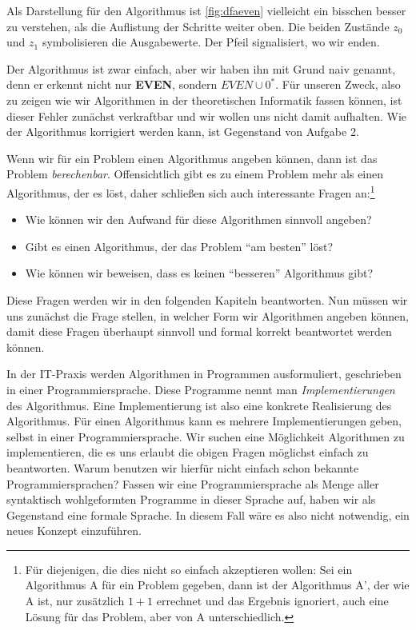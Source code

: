 Als Darstellung für den Algorithmus ist \autoref{fig:dfaeven}
vielleicht ein bisschen besser zu verstehen, als die Auflistung der Schritte weiter oben.
Die beiden Zustände $z_0$ und $z_1$ symbolisieren die Ausgabewerte.
Der Pfeil signalisiert, wo wir enden.

Der Algorithmus ist zwar einfach, aber wir haben ihn mit Grund naiv genannt,
denn er erkennt nicht nur \textbf{EVEN}, sondern $EVEN \cup 0^*$.
Für unseren Zweck,
also zu zeigen wie wir Algorithmen in der theoretischen Informatik fassen können,
ist dieser Fehler zunächst verkraftbar und wir wollen uns nicht damit aufhalten.
Wie der Algorithmus korrigiert werden kann,
ist Gegenstand von Aufgabe 2.

Wenn wir für ein Problem einen Algorithmus angeben können,
dann ist das Problem \emph{berechenbar}.
Offensichtlich gibt es zu einem Problem mehr als einen Algorithmus,
der es löst, daher schließen sich auch interessante Fragen an:\footnote{Für diejenigen, die dies nicht so einfach akzeptieren wollen:
Sei ein Algorithmus A für ein Problem gegeben, dann ist der Algorithmus A', der wie A ist,
nur zusätzlich $1+1$ errechnet und das Ergebnis ignoriert,
auch eine Lösung für das Problem, aber von A unterschiedlich.}
\begin{itemize}
    \item Wie können wir den Aufwand für diese Algorithmen sinnvoll angeben?
    \item Gibt es einen Algorithmus, der das Problem ``am besten'' löst?
    \item Wie können wir beweisen, dass es keinen ``besseren'' Algorithmus gibt?
\end{itemize}
Diese Fragen werden wir in den folgenden Kapiteln beantworten.
Nun müssen wir uns zunächst die Frage stellen,
in welcher Form wir Algorithmen angeben können,
damit diese Fragen überhaupt sinnvoll und formal korrekt beantwortet werden können.

In der IT-Praxis werden Algorithmen in Programmen ausformuliert,
geschrieben in einer Programmiersprache.
Diese Programme nennt man \emph{Implementierungen} des Algorithmus.
Eine Implementierung ist also eine konkrete Realisierung des Algorithmus.
Für einen Algorithmus kann es mehrere Implementierungen geben,
selbst in einer Programmiersprache.
Wir suchen eine Möglichkeit Algorithmen zu implementieren,
die es uns erlaubt die obigen Fragen möglichst einfach zu beantworten.
Warum benutzen wir hierfür nicht einfach schon bekannte Programmiersprachen?
Fassen wir eine Programmiersprache als
Menge aller syntaktisch wohlgeformten Programme in dieser Sprache auf, 
haben wir als Gegenstand eine formale Sprache.
In diesem Fall wäre es also nicht notwendig,
ein neues Konzept einzuführen.

